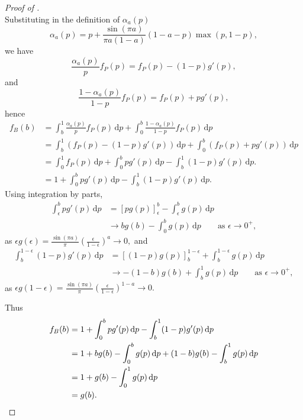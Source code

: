 \documentclass[10pt,a4paper]{amsart}
\begin{document}
\begin{proof}[Proof of ]
\begin{equation}
\end{equation}
	Substituting in the definition of $\alpha_a(p)$
\[
  \alpha_a(p) = p + \frac{\sin(\pi a)}{\pi a(1-a)}(1-a-p)\max(p,1-p),
\]
we have
\[
 \frac{\alpha_a(p)}{p}f_P(p) = f_P(p)-(1-p)g'(p),
\]
and 
\[
 \frac{1-\alpha_a(p)}{1-p}f_P(p) = f_P(p)+pg'(p),
\]
hence
\[
\begin{aligned}
f_B(b) &= \int_b^1 \frac{\alpha_a(p)}{p}f_P(p)\,\mathrm{d}p + \int_0^b\frac{1-\alpha_a(p)}{1-p}f_
P(p)\,\mathrm{d}p \\
&= \int_b^1\left(f_P(p) - (1-p)g'(p)\right)\,\mathrm{d}p + \int_0^b\left(f_P(p) + pg'(p)\right)\,\mathrm{d}p \\
&= \int_0^1 f_P(p)\,\mathrm{d}p + \int_0^b pg'(p)\,\mathrm{d}p -  \int_b^1 (1-p)g'(p)\,\mathrm{d}p.\\
&=  1 + \int_0^b pg'(p)\,\mathrm{d}p -  \int_b^1 (1-p)g'(p)\,\mathrm{d}p.
\end{aligned}
\]
Using integration by parts,
\[
\begin{aligned}
\int_\epsilon^b pg'(p)\,\mathrm{d}p &= [pg(p)]_\epsilon^b -\int_\epsilon^b g(p)\,\mathrm{d}p\\
&\rightarrow bg(b)-\int_0^bg(p)\,\mathrm{d}p\qquad\text{as }\epsilon\rightarrow 0^+,
\end{aligned}
\]
as $\epsilon g(\epsilon)=\frac{\sin(\pi a)}{\pi}\left(\frac{\epsilon}{1-\epsilon}\right)^a\rightarrow 0,$ and
\[
\begin{aligned}
\int_b^{1-\epsilon} (1-p)g'(p)\,\mathrm{d}p &= [(1-p)g(p)]_b^{1-\epsilon} +\int_b^{1-\epsilon} g(p)\,\mathrm{d}p\\
&\rightarrow -(1-b)g(b)+\int_b^1 g(p)\,\mathrm{d}p\qquad\text{as }\epsilon\rightarrow 0^+,
\end{aligned}
\]
as $\epsilon g(1-\epsilon)=\frac{\sin(\pi a)}{\pi}\left(\frac{\epsilon}{1-\epsilon}\right)^{1-a}\rightarrow 0.$

Thus
\begin{align*}
f_B(b) &=  1 + \int_0^b pg'(p)\,\mathrm{d}p -  \int_b^1 (1-p)g'(p)\,\mathrm{d}p\\
&= 1 + bg(b)-\int_0^bg(p)\,\mathrm{d}p + (1-b)g(b)-\int_b^1g(p)\,\mathrm{d}p\\
&= 1 + g(b)-\int_0^1g(p)\,\mathrm{d}p\\
&= g(b). \qedhere
\end{align*}
\end{proof}
\end{document}
